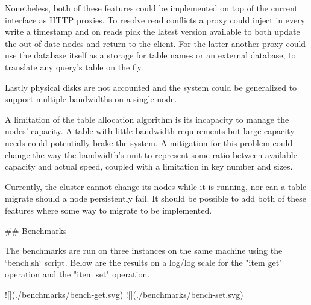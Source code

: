 Nonetheless, both of these features could be implemented on top of the current interface as HTTP proxies.
To resolve read conflicts a proxy could inject in every write a timestamp 
 and on reads pick the latest version available to both update the out of date nodes and return to the client.  
For the latter another proxy could use the database itself as a storage for table names or an external database,
 to translate any query's table on the fly.

Lastly physical disks are not accounted and the system 
 could be generalized to support multiple bandwidths on a single node.

A limitation of the table allocation algorithm is its incapacity to manage the nodes' capacity.
 A table with little bandwidth requirements but large capacity needs could potentially brake the system.
A mitigation for this problem could change the way the bandwidth's unit to represent
 some ratio between available capacity and actual speed, coupled with a limitation in key number and sizes.

Currently, the cluster cannot change its nodes while it is running, 
 nor can a table migrate should a node persistently fail.
It should be possible to add both of these features 
 where some way to migrate to be implemented.  

## Benchmarks

The benchmarks are run on three instances on the same machine using the `bench.sh` script.
Below are the results on a log/log scale for the "item get" operation and the "item set" operation.

![](./benchmarks/bench-get.svg)
![](./benchmarks/bench-set.svg)
